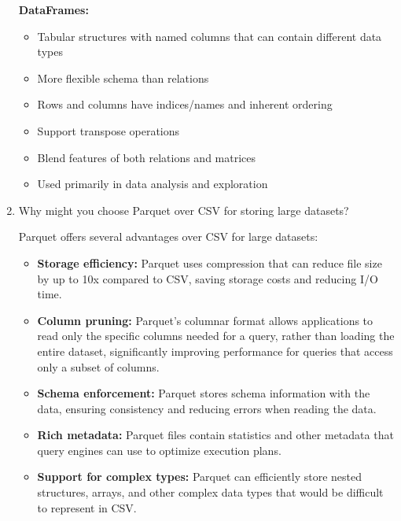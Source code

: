 \documentclass[12pt]{article}
\begin{document}
\begin{enumerate}
\begin{tcolorbox}[colback=blue!5!white,colframe=blue!75!black,title=Solution]
    \textbf{DataFrames:}
    \begin{itemize}
        \item Tabular structures with named columns that can contain different data types
        \item More flexible schema than relations
        \item Rows and columns have indices/names and inherent ordering
        \item Support transpose operations
        \item Blend features of both relations and matrices
        \item Used primarily in data analysis and exploration
    \end{itemize}
    \end{tcolorbox}
    
    \item Why might you choose Parquet over CSV for storing large datasets?
    
    \begin{tcolorbox}[colback=blue!5!white,colframe=blue!75!black,title=Solution]
    Parquet offers several advantages over CSV for large datasets:
    
    \begin{itemize}
        \item \textbf{Storage efficiency:} Parquet uses compression that can reduce file size by up to 10x compared to CSV, saving storage costs and reducing I/O time.
        
        \item \textbf{Column pruning:} Parquet's columnar format allows applications to read only the specific columns needed for a query, rather than loading the entire dataset, significantly improving performance for queries that access only a subset of columns.
        
        \item \textbf{Schema enforcement:} Parquet stores schema information with the data, ensuring consistency and reducing errors when reading the data.
        
        \item \textbf{Rich metadata:} Parquet files contain statistics and other metadata that query engines can use to optimize execution plans.
        
        \item \textbf{Support for complex types:} Parquet can efficiently store nested structures, arrays, and other complex data types that would be difficult to represent in CSV.
        

\end{itemize}
\end{tcolorbox}
\end{enumerate}
\end{document}
